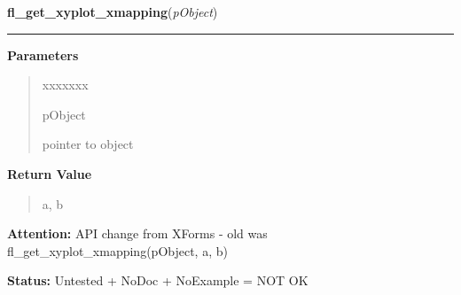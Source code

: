 \hspace{.8\funcindent}\begin{boxedminipage}{\funcwidth}

    \raggedright \textbf{fl\_get\_xyplot\_xmapping}(\textit{pObject})

    \vspace{-1.5ex}

    \rule{\textwidth}{0.5\fboxrule}
\setlength{\parskip}{2ex}
\setlength{\parskip}{1ex}
      \textbf{Parameters}
      \vspace{-1ex}

      \begin{quote}
        \begin{Ventry}{xxxxxxx}

          \item[pObject]

          pointer to object

        \end{Ventry}

      \end{quote}

      \textbf{Return Value}
    \vspace{-1ex}

      \begin{quote}
      a, b

      \end{quote}

\textbf{Attention:} API change from XForms - old was fl\_get\_xyplot\_xmapping(pObject, a, b)



\textbf{Status:} Untested + NoDoc + NoExample = NOT OK



    \end{boxedminipage}

    \label{xformslib:library:fl_get_xyplot_ymapping}

    \vspace{0.5ex}


